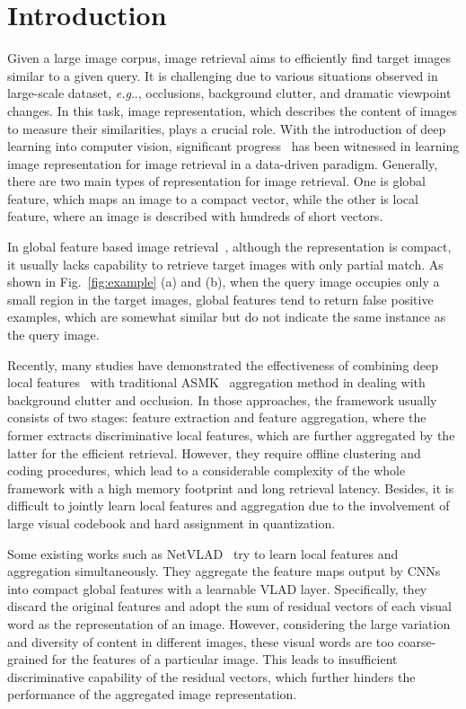 \documentclass[letterpaper]{article} \usepackage{aaai22}  \usepackage{times}  \usepackage{helvet}  \usepackage{courier}  \usepackage[hyphens]{url}  \usepackage{graphicx} \urlstyle{rm} \def\UrlFont{\rm}  \usepackage{natbib}  \usepackage{caption} \DeclareCaptionStyle{ruled}{labelfont=normalfont,labelsep=colon,strut=off} \frenchspacing  \setlength{\pdfpagewidth}{8.5in}  \setlength{\pdfpageheight}{11in}  \usepackage{algorithm}
\makeatletter
\DeclareRobustCommand\onedot{\futurelet\@let@token\@onedot}
\def\@onedot{\ifx\@let@token.\else.\null\fi\xspace}
\def\eg{\emph{e.g}\onedot} \def\Eg{\emph{E.g}\onedot}
\makeatother
\begin{document}
\section{Introduction} \label{sec:introduction}
Given a large image corpus, image retrieval aims to efficiently find target images similar to a given query.
It is challenging due to various situations observed in large-scale dataset, \eg, occlusions, background clutter, and dramatic viewpoint changes. 
In this task, image representation, which describes the content of images to measure their similarities, plays a crucial role. With the introduction of deep learning into computer vision, significant progress~\cite{babenko2014neural,gordo2017end,cao2020unifying,aaai1,noh2017large}  has been witnessed in learning image representation for image retrieval in a data-driven paradigm. 
Generally, there are two main types of representation for image retrieval. 
One is global feature, which maps an image to a compact vector, while the other is local feature, where an image is described with hundreds of short vectors. 

In global feature based image retrieval~\cite{radenovic2018fine,Babenko_2015_ICCV}, although the representation is compact, it usually lacks capability to retrieve target images with only partial match.  
As shown in Fig.~\ref{fig:example} (a) and (b), when the query image occupies only a small region in the target images, global features tend to return false positive examples, which are somewhat similar but do not indicate the same instance as the query image. 

Recently, many studies have demonstrated the effectiveness of combining deep local features~\cite{tolias2020learning,noh2017large,teichmann2019detect} with traditional ASMK~\cite{tolias2013aggregate} aggregation method in dealing with background clutter and occlusion. 
In those approaches, the framework usually consists of two stages: feature extraction and feature aggregation, where the former extracts discriminative local features, which are further aggregated by the latter for the efficient retrieval. 
However, they require offline clustering and coding procedures, which lead to a considerable complexity of the whole framework with a high memory footprint and long retrieval latency. 
Besides, it is difficult to jointly learn local features and aggregation due to the involvement of large visual codebook and hard assignment in quantization. 

Some existing works such as NetVLAD~\cite{arandjelovic2016netvlad} try to learn local features and aggregation simultaneously.
They aggregate the feature maps output by CNNs into compact global features with a learnable VLAD layer. Specifically, they discard the original features and adopt the sum of residual vectors of each visual word as the representation of an image. However, considering the large variation and diversity of content in different images, these visual words are too coarse-grained for the features of a particular image. This leads to insufficient discriminative capability of the residual vectors, which further hinders the performance of the aggregated image representation.
\end{document}
